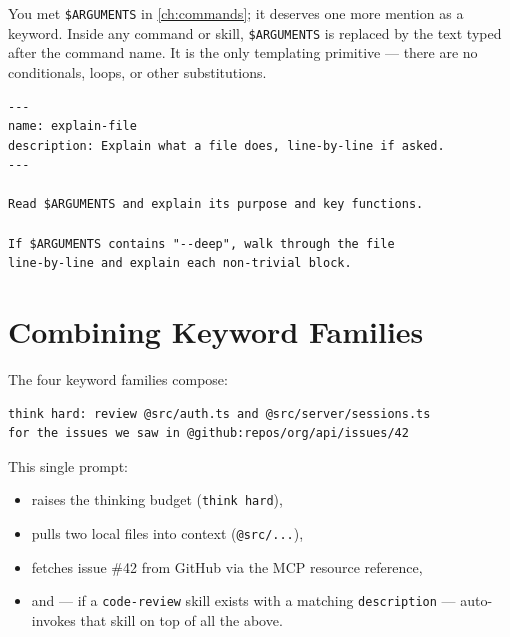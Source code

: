 You met \texttt{\$ARGUMENTS} in \cref{ch:commands}; it deserves one more
mention as a keyword. Inside any command or skill, \texttt{\$ARGUMENTS}
is replaced by the text typed after the command name. It is the only
templating primitive — there are no conditionals, loops, or other
substitutions.

\begin{lstlisting}[caption={A skill using \$ARGUMENTS for dynamic input}]
---
name: explain-file
description: Explain what a file does, line-by-line if asked.
---

Read $ARGUMENTS and explain its purpose and key functions.

If $ARGUMENTS contains "--deep", walk through the file
line-by-line and explain each non-trivial block.
\end{lstlisting}

\section{Combining Keyword Families}
\label{sec:keyword-combos}

The four keyword families compose:

\begin{lstlisting}[caption={A prompt that uses every keyword family}]
think hard: review @src/auth.ts and @src/server/sessions.ts
for the issues we saw in @github:repos/org/api/issues/42
\end{lstlisting}

This single prompt:
\begin{itemize}
  \item raises the thinking budget (\texttt{think hard}),
  \item pulls two local files into context (\texttt{@src/...}),
  \item fetches issue \#42 from GitHub via the MCP resource reference,
  \item and — if a \texttt{code-review} skill exists with a matching
        \texttt{description} — auto-invokes that skill on top of all the
        above.
\end{itemize}

